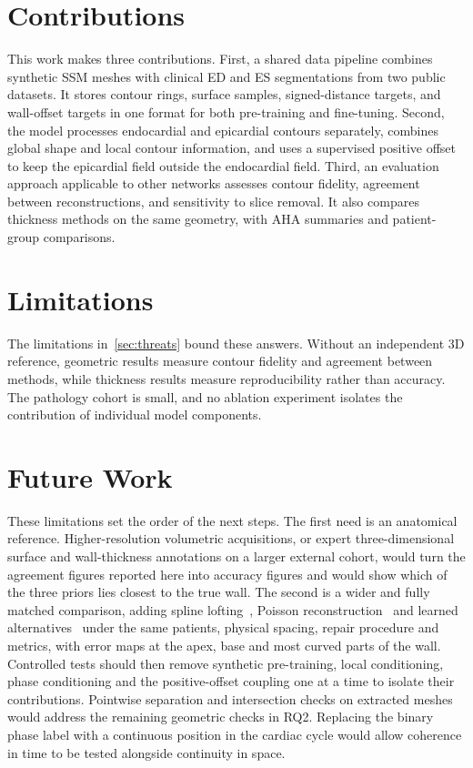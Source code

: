 \section{Contributions}
\label{sec:conclusion-contributions}
\noindent
This work makes three contributions. First, a shared data pipeline combines
synthetic SSM meshes with clinical ED and ES segmentations from two public
datasets. It stores contour rings, surface samples, signed-distance targets,
and wall-offset targets in one format for both pre-training and fine-tuning.
Second, the model processes endocardial and epicardial contours separately,
combines global shape and local contour information, and uses a supervised
positive offset to keep the epicardial field outside the endocardial field.
Third, an evaluation approach applicable to other networks assesses contour
fidelity, agreement between reconstructions, and sensitivity to slice removal.
It also compares thickness methods on the same geometry, with AHA summaries
and patient-group comparisons.

\section{Limitations}
\label{sec:conclusion-limitations}
\noindent
The limitations in~\cref{sec:threats} bound these answers. Without an independent
3D reference, geometric results measure contour fidelity and agreement between
methods, while thickness results measure reproducibility rather than accuracy.
The pathology cohort is small, and no ablation experiment isolates the
contribution of individual model components.

\section{Future Work}
\label{sec:conclusion-future-work}
\noindent
These limitations set the order of the next steps. The first need is an
anatomical reference. Higher-resolution volumetric acquisitions, or expert
three-dimensional surface and wall-thickness annotations on a larger external
cohort, would turn the agreement figures reported here into accuracy figures
and would show which of the three priors lies closest to the true wall. The
second is a wider and fully matched comparison, adding spline
lofting~\parencite{fuchs1977contours}, Poisson
reconstruction~\parencite{kazhdan2006poisson} and learned
alternatives~\parencite{occupancynetworks2019,muffoletto2025nihc} under the
same patients, physical spacing, repair procedure and metrics, with error maps
at the apex, base and most curved parts of the wall. Controlled tests should
then remove
synthetic pre-training, local conditioning, phase conditioning and the
positive-offset coupling one at a time to isolate their contributions.
Pointwise separation and intersection checks on extracted meshes would address
the remaining geometric checks in RQ2. Replacing the binary phase label with a
continuous position in the cardiac cycle would allow coherence in time to be
tested alongside continuity in space.


